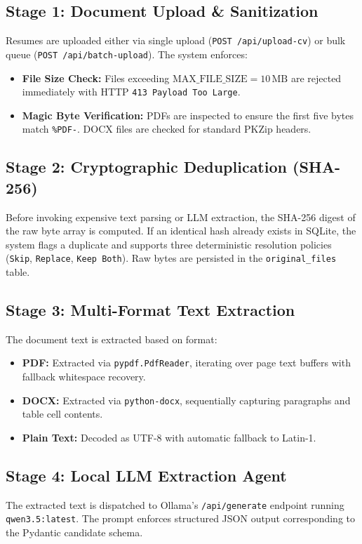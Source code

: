 \documentclass[11pt,a4paper]{report}
\begin{document}
\subsection{Stage 1: Document Upload \& Sanitization}
Resumes are uploaded either via single upload (\texttt{POST /api/upload-cv}) or bulk queue (\texttt{POST /api/batch-upload}). The system enforces:
\begin{itemize}[leftmargin=1.5em]
    \item \textbf{File Size Check:} Files exceeding $\text{MAX\_FILE\_SIZE} = 10\,\text{MB}$ are rejected immediately with HTTP \texttt{413 Payload Too Large}.
    \item \textbf{Magic Byte Verification:} PDFs are inspected to ensure the first five bytes match \texttt{\%PDF-}. DOCX files are checked for standard PKZip headers.
\end{itemize}

\subsection{Stage 2: Cryptographic Deduplication (SHA-256)}
Before invoking expensive text parsing or LLM extraction, the SHA-256 digest of the raw byte array is computed. If an identical hash already exists in SQLite, the system flags a duplicate and supports three deterministic resolution policies (\texttt{Skip}, \texttt{Replace}, \texttt{Keep Both}). Raw bytes are persisted in the \texttt{original\_files} table.

\subsection{Stage 3: Multi-Format Text Extraction}
The document text is extracted based on format:
\begin{itemize}[leftmargin=1.5em]
    \item \textbf{PDF:} Extracted via \texttt{pypdf.PdfReader}, iterating over page text buffers with fallback whitespace recovery.
    \item \textbf{DOCX:} Extracted via \texttt{python-docx}, sequentially capturing paragraphs and table cell contents.
    \item \textbf{Plain Text:} Decoded as UTF-8 with automatic fallback to Latin-1.
\end{itemize}

\subsection{Stage 4: Local LLM Extraction Agent}
The extracted text is dispatched to Ollama's \texttt{/api/generate} endpoint running \texttt{qwen3.5:latest}. The prompt enforces structured JSON output corresponding to the Pydantic candidate schema.
\end{document}
